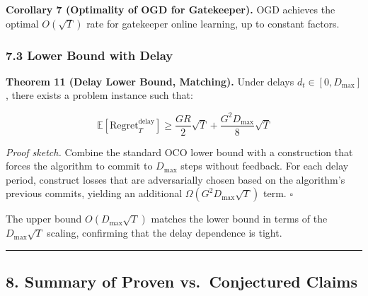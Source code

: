 \documentclass[
  12pt,
]{article}
\begin{document}
\textbf{Corollary 7 (Optimality of OGD for Gatekeeper).} OGD achieves
the optimal \(O(\sqrt{T})\) rate for gatekeeper online learning, up to
constant factors.

\subsubsection{7.3 Lower Bound with Delay}\label{lower-bound-with-delay}

\textbf{Theorem 11 (Delay Lower Bound, Matching).} Under delays
\(d_t \in [0, D_{\max}]\), there exists a problem instance such that:

\[\mathbb{E}[\text{Regret}_T^{\text{delay}}] \geq \frac{GR}{2} \sqrt{T} + \frac{G^2 D_{\max}}{8} \sqrt{T}\]

\emph{Proof sketch.} Combine the standard OCO lower bound with a
construction that forces the algorithm to commit to \(D_{\max}\) steps
without feedback. For each delay period, construct losses that are
adversarially chosen based on the algorithm's previous commits, yielding
an additional \(\Omega(G^2 D_{\max}\sqrt{T})\) term. \(\square\)

The upper bound \(O(D_{\max}\sqrt{T})\) matches the lower bound in terms
of the \(D_{\max}\sqrt{T}\) scaling, confirming that the delay
dependence is tight.

\begin{center}\rule{0.5\linewidth}{0.5pt}\end{center}

\subsection{8. Summary of Proven vs.~Conjectured
Claims}\label{summary-of-proven-vs.-conjectured-claims}
\end{document}
